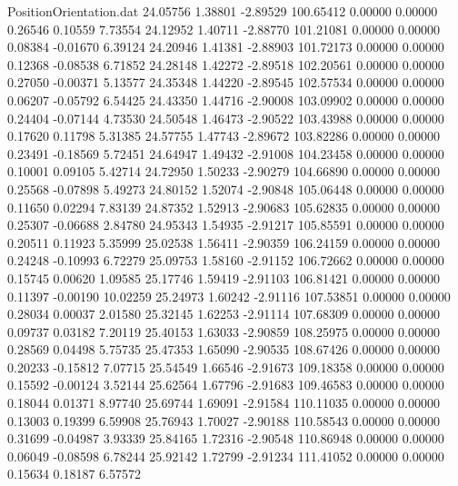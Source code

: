 \begin{filecontents}{PositionOrientation.dat}
  24.05756    1.38801   -2.89529   100.65412    0.00000    0.00000    0.26546    0.10559    7.73554
  24.12952    1.40711   -2.88770   101.21081    0.00000    0.00000    0.08384   -0.01670    6.39124
  24.20946    1.41381   -2.88903   101.72173    0.00000    0.00000    0.12368   -0.08538    6.71852
  24.28148    1.42272   -2.89518   102.20561    0.00000    0.00000    0.27050   -0.00371    5.13577
  24.35348    1.44220   -2.89545   102.57534    0.00000    0.00000    0.06207   -0.05792    6.54425
  24.43350    1.44716   -2.90008   103.09902    0.00000    0.00000    0.24404   -0.07144    4.73530
  24.50548    1.46473   -2.90522   103.43988    0.00000    0.00000    0.17620    0.11798    5.31385
  24.57755    1.47743   -2.89672   103.82286    0.00000    0.00000    0.23491   -0.18569    5.72451
  24.64947    1.49432   -2.91008   104.23458    0.00000    0.00000    0.10001    0.09105    5.42714
  24.72950    1.50233   -2.90279   104.66890    0.00000    0.00000    0.25568   -0.07898    5.49273
  24.80152    1.52074   -2.90848   105.06448    0.00000    0.00000    0.11650    0.02294    7.83139
  24.87352    1.52913   -2.90683   105.62835    0.00000    0.00000    0.25307   -0.06688    2.84780
  24.95343    1.54935   -2.91217   105.85591    0.00000    0.00000    0.20511    0.11923    5.35999
  25.02538    1.56411   -2.90359   106.24159    0.00000    0.00000    0.24248   -0.10993    6.72279
  25.09753    1.58160   -2.91152   106.72662    0.00000    0.00000    0.15745    0.00620    1.09585
  25.17746    1.59419   -2.91103   106.81421    0.00000    0.00000    0.11397   -0.00190   10.02259
  25.24973    1.60242   -2.91116   107.53851    0.00000    0.00000    0.28034    0.00037    2.01580
  25.32145    1.62253   -2.91114   107.68309    0.00000    0.00000    0.09737    0.03182    7.20119
  25.40153    1.63033   -2.90859   108.25975    0.00000    0.00000    0.28569    0.04498    5.75735
  25.47353    1.65090   -2.90535   108.67426    0.00000    0.00000    0.20233   -0.15812    7.07715
  25.54549    1.66546   -2.91673   109.18358    0.00000    0.00000    0.15592   -0.00124    3.52144
  25.62564    1.67796   -2.91683   109.46583    0.00000    0.00000    0.18044    0.01371    8.97740
  25.69744    1.69091   -2.91584   110.11035    0.00000    0.00000    0.13003    0.19399    6.59908
  25.76943    1.70027   -2.90188   110.58543    0.00000    0.00000    0.31699   -0.04987    3.93339
  25.84165    1.72316   -2.90548   110.86948    0.00000    0.00000    0.06049   -0.08598    6.78244
  25.92142    1.72799   -2.91234   111.41052    0.00000    0.00000    0.15634    0.18187    6.57572

\end{filecontents}
